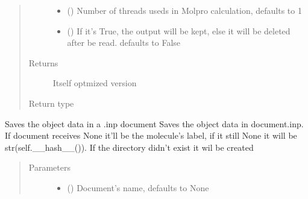 \documentclass[letterpaper,10pt,english]{sphinxmanual}
\begin{document}
\begin{fulllineitems}
\begin{fulllineitems}
\begin{quote}
\begin{description}
\begin{itemize}
\item {} 
\sphinxAtStartPar
{} (\sphinxstyleliteralemphasis{\sphinxupquote{, }}) \textendash{} Number of threads useds in Molpro calculation, defaults to 1

\item {} 
\sphinxAtStartPar
{} (\sphinxstyleliteralemphasis{\sphinxupquote{, }}) \textendash{} If it’s True, the output will be kept, else it will be deleted after be read.
defaults to False

\end{itemize}

\item[{Returns}] \leavevmode
\sphinxAtStartPar
Itself optmized version

\item[{Return type}] \leavevmode
\sphinxAtStartPar
{\hyperref[\detokenize{molecular:molecular.Molecule}]{}}

\end{description}\end{quote}

\end{fulllineitems}


\begin{fulllineitems}
\label{\detokenize{molecular:molecular.Molecule.save}}
\sphinxAtStartPar
Saves the object data in a .inp document
Saves the object data in document.inp. If document receives None it’ll be the molecule’s label, if it still
None it will be str(self.\_\_hash\_\_()). If the directory didn’t exist it wil be created
\begin{quote}\begin{description}
\item[{Parameters}] \leavevmode\begin{itemize}
\item {} 
\sphinxAtStartPar
{} (\sphinxstyleliteralemphasis{\sphinxupquote{, }}) \textendash{} Document’s name, defaults to None


\end{itemize}
\end{description}
\end{quote}
\end{fulllineitems}
\end{fulllineitems}
\end{document}

